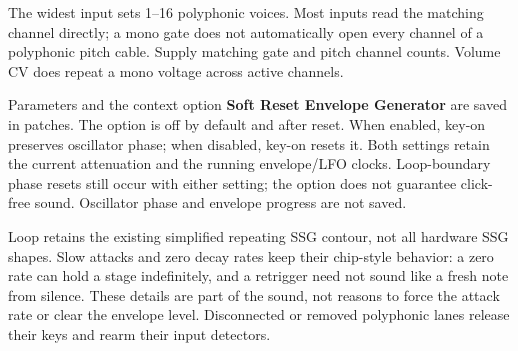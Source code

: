 The widest input sets 1--16 polyphonic voices. Most inputs read the matching
channel directly; a mono gate does not automatically open every channel of
a polyphonic pitch cable. Supply matching gate and pitch channel counts.
Volume CV does repeat a mono voltage across active channels.

Parameters and the context option \textbf{Soft Reset Envelope Generator}
are saved in patches. The option is off by default and after reset. When
enabled, key-on preserves oscillator phase; when disabled, key-on resets it.
Both settings retain the current attenuation and the running envelope/LFO
clocks. Loop-boundary phase resets still occur with either setting; the
option does not guarantee click-free sound. Oscillator phase and envelope
progress are not saved.

Loop retains the existing simplified repeating SSG contour, not all hardware
SSG shapes. Slow attacks and zero decay rates keep their chip-style behavior:
a zero rate can hold a stage indefinitely, and a retrigger need not sound like
a fresh note from silence. These details are part of the sound, not reasons
to force the attack rate or clear the envelope level. Disconnected or removed
polyphonic lanes release their keys and rearm their input detectors.
